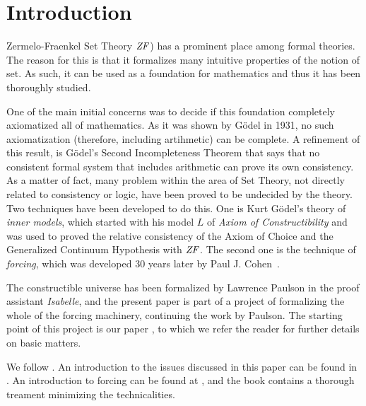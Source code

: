 \section{Introduction}
Zermelo-Fraenkel Set Theory $\mathit{ZF}$) has a prominent place among formal
theories. The reason for this is that it formalizes many intuitive
properties of the notion of set. As such, it can be used as a
foundation for mathematics and thus it has been
thoroughly studied. 

One of the main initial concerns was to decide if this foundation
completely axiomatized all of mathematics. As it was shown by G\"odel
in 1931, no  such axiomatization (therefore, including artihmetic) can
be complete. A refinement of this result, is G\"odel's Second
Incompleteness Theorem that says that no consistent formal system that
includes arithmetic can prove its own consistency. As a matter of
fact, many problem within the area of Set Theory, not directly related
to consistency or logic, have been proved to be undecided by the
theory. Two techniques have been developed to do this. One is Kurt G\"odel's
theory of \emph{inner models}, which started with his model $L$ of
\emph{Axiom of Constructibility} \cite{godel-L} and was used to proved the relative
consistency of the Axiom of Choice and the Generalized Continuum
Hypothesis with $\mathit{ZF}$. The second one is the technique of
\emph{forcing}, which was developed 30 years later by Paul
J. Cohen~\cite{Cohen-CH-PNAS}.

The constructible universe  has been formalized by Lawrence
Paulson \cite{paulson_2003} in the proof assistant \emph{Isabelle}, and
the present paper is part of a project of formalizing the whole of the
forcing machinery, continuing the work by Paulson. The starting point
of this project is our paper \cite{2018arXiv180705174G}, to which we
refer the reader for further details on basic matters.

We follow \cite{kunen2011set}. An introduction to the issues discussed
in this paper can be found in \cite{2018arXiv180705174G}. An
introduction to forcing can be found at \cite{chow-beginner-forcing},
and the book \cite{weaver2014forcing} contains a thorough treament
minimizing the technicalities.

